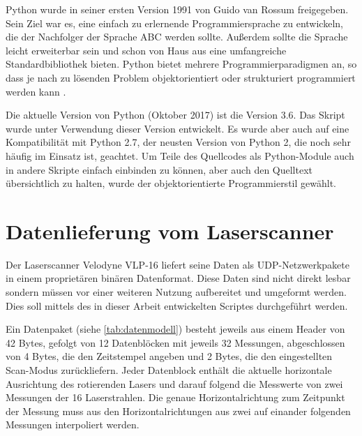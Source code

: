 \documentclass[a4paper,12pt,bibliography=totoc, listof=totoc,titlepage,pointlessnumbers]{scrreprt}
\begin{document}
Python wurde in seiner ersten Version 1991 von Guido van Rossum freigegeben. Sein Ziel war es, eine einfach zu erlernende Programmiersprache zu entwickeln, die der Nachfolger der Sprache ABC werden sollte. Außerdem sollte die Sprache leicht erweiterbar sein und schon von Haus aus eine umfangreiche Standardbibliothek bieten. Python bietet mehrere Programmierparadigmen an, so dass je nach zu lösenden Problem objektorientiert oder strukturiert programmiert werden kann \citep[S. 14]{python}.

Die aktuelle Version von Python (Oktober 2017) ist die Version 3.6. Das Skript wurde unter Verwendung dieser Version entwickelt. Es wurde aber auch auf eine Kompatibilität mit Python 2.7, der neusten Version von Python 2, die noch sehr häufig im Einsatz ist, geachtet. Um Teile des Quellcodes als Python-Module auch in andere Skripte einfach einbinden zu können, aber auch den Quelltext übersichtlich zu halten, wurde der objektorientierte Programmierstil gewählt.

\section{Datenlieferung vom Laserscanner}
\label{ss:Datenlieferung}
Der Laserscanner Velodyne VLP-16 liefert seine Daten als UDP-Netzwerkpakete in einem proprietären binären Datenformat. Diese Daten sind nicht direkt lesbar sondern müssen vor einer weiteren Nutzung aufbereitet und umgeformt werden. Dies soll mittels des in dieser Arbeit entwickelten Scriptes durchgeführt werden.

Ein Datenpaket (siehe \autoref{tab:datenmodell}) besteht jeweils aus einem Header von 42 Bytes, gefolgt von 12 Datenblöcken mit jeweils 32 Messungen, abgeschlossen von 4 Bytes, die den Zeitstempel angeben und 2 Bytes, die den eingestellten Scan-Modus zurückliefern. Jeder Datenblock enthält die aktuelle horizontale Ausrichtung des rotierenden Lasers und darauf folgend die Messwerte von zwei Messungen der 16 Laserstrahlen. Die genaue Horizontalrichtung zum Zeitpunkt der Messung muss aus den Horizontalrichtungen aus zwei auf einander folgenden Messungen interpoliert werden.
\end{document}
